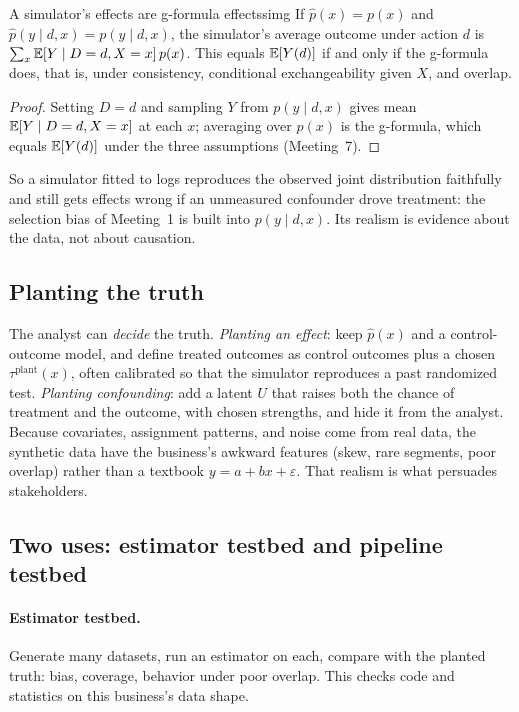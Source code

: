 \documentclass[11pt]{article}
\begin{document}
\begin{prop}{A simulator's effects are g-formula effects}{simg}
If $\hat p(x) = p(x)$ and $\hat p(y \mid d, x) = p(y \mid d, x)$, the simulator's average outcome under action $d$ is
$\sum_x \mathbb{E}[Y \mid D=d, X=x]\,p(x)$. This equals $\mathbb{E}[Y(d)]$ if and only if the g-formula does, that is, under consistency, conditional
exchangeability given $X$, and overlap.
\end{prop}
\begin{proof}
Setting $D = d$ and sampling $Y$ from $p(y \mid d, x)$ gives mean $\mathbb{E}[Y \mid D=d, X=x]$ at each $x$; averaging over $p(x)$ is the g-formula,
which equals $\mathbb{E}[Y(d)]$ under the three assumptions (Meeting~7).
\end{proof}

So a simulator fitted to logs reproduces the observed joint distribution faithfully and still gets effects wrong if an unmeasured
confounder drove treatment: the selection bias of Meeting~1 is built into $p(y \mid d, x)$. Its realism is evidence about the data,
not about causation.

\subsection{Planting the truth}

The analyst can \emph{decide} the truth. \emph{Planting an effect}: keep $\hat p(x)$ and a control-outcome model, and define treated
outcomes as control outcomes plus a chosen $\tau^{\text{plant}}(x)$, often calibrated so that the simulator reproduces a past
randomized test. \emph{Planting confounding}: add a latent $U$ that raises both the chance of treatment and the outcome, with chosen
strengths, and hide it from the analyst. Because covariates, assignment patterns, and noise come from real data, the synthetic data
have the business's awkward features (skew, rare segments, poor overlap) rather than a textbook $y = a + bx + \varepsilon$. That realism is
what persuades stakeholders.

\subsection{Two uses: estimator testbed and pipeline testbed}

\paragraph{Estimator testbed.} Generate many datasets, run an estimator on each, compare with the planted truth: bias, coverage,
behavior under poor overlap. This checks code and statistics on this business's data shape.
\end{document}
